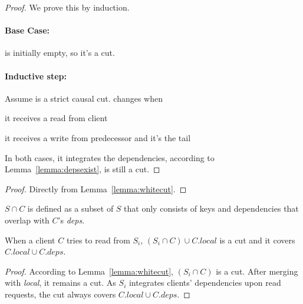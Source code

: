 \begin{lemma}\label{lemma:whitecut}
\end{lemma}
\begin{proof}
We prove this by induction.
\paragraph{Base Case:} \white{} is initially empty, so it's a cut.
\paragraph{Inductive step:} Assume \white{} is a strict causal cut. \white{} changes when
\begin{myenumerate2}
\item it receives a read from client
\item it receives a write from predecessor and it's the tail
\end{myenumerate2}
In both cases, it integrates the dependencies, according to Lemma~\ref{lemma:depsexist},  \white{} is still a cut.
\end{proof}

\begin{theorem}\label{lemma:txn}
\end{theorem}
\begin{proof}
Directly from Lemma~\ref{lemma:whitecut}.
\end{proof}

\begin{definition}
$S \cap C$ is defined as a subset of $S$ that only consists of keys and
dependencies that overlap with $C$'s \textit{deps}.
\end{definition}


\begin{theorem}
When a client $C$ tries to read from $S_i$, $(S_i \cap C) \cup C.local$ is a cut and it covers $C.local \cup C.deps$.
\end{theorem}
\begin{proof}
According to Lemma~\ref{lemma:whitecut}, $(S_i \cap C)$ is a cut. After merging with \textit{local}, it remains a cut. As $S_i$ integrates clients' dependencies upon read requests, the cut always covers $C.local \cup C.deps$.
\end{proof}
